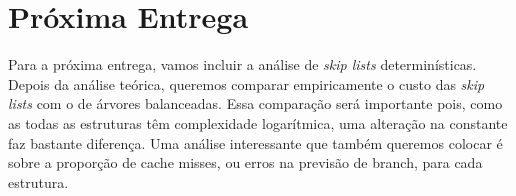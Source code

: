 \documentclass[paper=a4, fontsize=11pt]{scrartcl} %
\numberwithin{equation}{section}
\numberwithin{figure}{section}
\numberwithin{table}{section}
\numberwithin{definition}{section}
\numberwithin{theorem}{section}
\numberwithin{property}{section}
\numberwithin{proposition}{section}
\newcommand{\sls}{\textit{skip lists}\xspace}
\begin{document}
\section{Próxima Entrega}

Para a próxima entrega, vamos incluir a análise de \sls determinísticas. Depois da análise teórica, queremos
comparar empiricamente o custo das \sls com o de árvores balanceadas. Essa comparação será importante pois, como
as todas as estruturas têm complexidade logarítmica, uma alteração na constante faz bastante diferença. Uma
análise interessante que também queremos colocar é sobre a proporção de cache misses, 
ou erros na previsão de branch, para cada estrutura. 


{}
\end{document}
